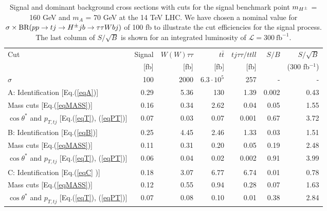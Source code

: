 \begin{table}[h]
\centering
\resizebox{14cm}{!} {
\begin{tabular}{ |l | r |r r r |r r|}  \hline
Cut 		 														&Signal 	&		$W(W)\tau\tau$ 	&	$t\bar{t}$		&$tj\tau\tau/ttll$	&$S/B$	&$S/\sqrt{B}$	\\
																&[fb]		&			[fb]		&	[fb]					&[fb]		&		&	(300 fb$^{-1}$)		\\
\hline
$\sigma$    														&100 		&		  2000		&    $6.3 \cdot 10^5$  				& 257		&	-			&	-	\\
\hline
A: Identification [Eq.(\ref{eqA})] 		 								&0.29	 	&           5.36 		&    130			& 1.39		&	 0.002     	& 0.43	\\
\phantom{A:} 
Mass cuts [Eq.(\ref{eqMASS})]											&0.16	 	&           0.34 		&    2.62				& 0.04		&	 0.05     	& 1.55	\\
\phantom{A:} $\cos\theta^*$ and $p_{T,tj}$ [Eq.(\ref{eqT}), (\ref{eqPT})]&0.07	 	&           0.03 		&    0.07					& 0.001		& 	 0.67     	& 3.72	\\
\hline
B: Identification [Eq.(\ref{eqB})]	 									&0.25	 	&           4.45 		&    2.46					& 1.33	&	 0.03    		& 1.51	\\
\phantom{B:} Mass cuts [Eq.(\ref{eqMASS})]								&0.11	 	&           0.31 		&    0.20					& 0.05	&	 0.19    		& 2.48	\\
\phantom{B:} $\cos\theta^*$ and $p_{T,tj}$ [Eq.(\ref{eqT}), (\ref{eqPT})]&0.06	 	&           0.04 		&    0.02					& 0.002		&	 0.91    		& 3.99	\\
\hline
C: Identification [Eq.(\ref{eqC} )]	 									&0.18	 	&           3.07 		&    6.77				& 6.74		& 	0.01     	& 0.78  \\
\phantom{C:} Mass cuts [Eq.(\ref{eqMASS})]								&0.12	 	&           0.55 		&    0.94				& 0.28		& 	0.07     	& 1.63  \\
\phantom{C:} $\cos\theta^*$ and $p_{T,tj}$ [Eq.(\ref{eqT}), (\ref{eqPT})]&0.07	 	&           0.08 		&    0.10					& 0.01		& 	0.38     	& 2.84 \\
\hline
\end{tabular}
}
\caption{Signal and dominant background cross sections with cuts for the signal benchmark point $m_{H^{\pm}}$ = 160 GeV   and $m_A$ = 70 GeV at the 14 TeV LHC.  We have chosen a nominal value for $\sigma \times \text{BR}(pp \rightarrow tj \to H^{\pm}  j b \rightarrow \tau\tau W b j )$ of 100 fb to illustrate the cut efficiencies for the signal process.  The last column of $S/\sqrt{B}$ is shown for an integrated luminosity of $\mathcal{L}=300\  \text{fb}^{-1}$.  }
\label{tab:tj}
\end{table}

